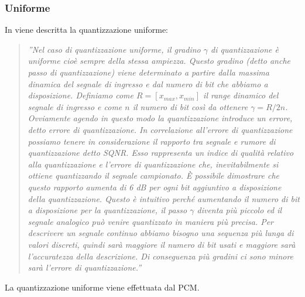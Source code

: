 \documentclass[a4paper]{report} %
\begin{document}
\subsubsection{Uniforme}
In \cite{art:rif.4} viene descritta la quantizzazione uniforme:
\begin{quote}
	\textit{''Nel caso di quantizzazione uniforme, il gradino $\gamma$ di quantizzazione è uniforme cioè sempre della stessa ampiezza. Questo gradino (detto anche passo di quantizzazione) viene determinato a partire dalla massima dinamica del segnale di ingresso e dal numero di bit che abbiamo a disposizione. Definiamo come $R=[x_{max},x_{min}]$ il range dinamico del segnale di ingresso e come $n$ il numero di bit così da ottenere $\gamma=R/2n$. Ovviamente agendo in questo modo la quantizzazione introduce un errore, detto errore di quantizzazione. In correlazione all'errore di quantizzazione possiamo tenere in considerazione il rapporto tra segnale e rumore di quantizzazione detto SQNR. Esso rappresenta un indice di qualità relativo alla quantizzazione e l'errore di quantizzazione che, inevitabilmente si ottiene quantizzando il segnale campionato. È possibile dimostrare che questo rapporto aumenta di 6 dB per ogni bit aggiuntivo a disposizione della quantizzazione. Questo è intuitivo perché aumentando il numero di bit a disposizione per la quantizzazione, il passo $\gamma$ diventa più piccolo ed il segnale analogico può venire quantizzato in maniera più precisa. Per descrivere un segnale continuo abbiamo bisogno una sequenza più lunga di valori discreti, quindi sarà maggiore il numero di bit usati e maggiore sarà l'accuratezza della descrizione. Di conseguenza più gradini ci sono minore sarà l'errore di quantizzazione.''}  
\end{quote}
La quantizzazione uniforme viene effettuata dal PCM.
\end{document}
